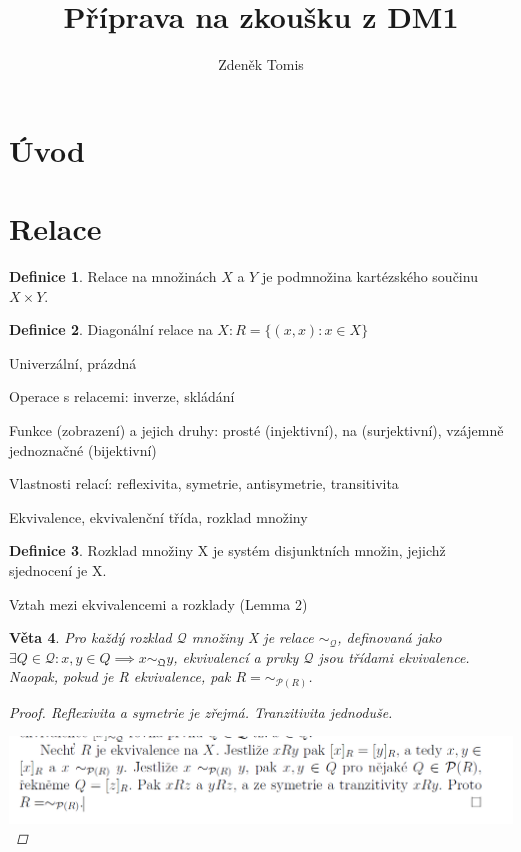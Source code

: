 \documentclass[10pt,a4paper]{article}
\title{Příprava na zkoušku z DM1}
\date{}
\author{Zdeněk Tomis}
\theoremstyle{plain}
\newtheorem{veta}{Věta}
\theoremstyle{definition}
\newtheorem{definice}[veta]{Definice}
\begin{document}
\maketitle

\section{Úvod}

\section{Relace}

\begin{definice} Relace na množinách $X$ a $Y$ je podmnožina kartézského součinu $X \times Y$.
\end{definice}

\begin{definice}
Diagonální relace na $X: R = \{ (x,x):  x \in X \}$
\end{definice} 

Univerzální, prázdná

Operace s relacemi: inverze, skládání

Funkce (zobrazení) a jejich druhy: prosté (injektivní), na (surjektivní), vzájemně jednoznačné (bijektivní)

Vlastnosti relací: reflexivita, symetrie, antisymetrie, transitivita

Ekvivalence, ekvivalenční třída, rozklad množiny

\begin{definice}
Rozklad množiny X je systém disjunktních množin, jejichž sjednocení je X.
\end{definice}



Vztah mezi ekvivalencemi a rozklady (Lemma 2) 
\begin{veta}
Pro každý rozklad  $\mathcal{Q}$ množiny X je relace $\sim_\mathcal{Q}$, definovaná jako $\exists Q \in \mathcal{Q}: x,y \in Q \implies x \sim_\mathfrak{Q} y$, ekvivalencí a prvky $\mathcal{Q}$ jsou třídami ekvivalence. 
Naopak, pokud je R ekvivalence, pak $R=\sim_{\mathcal{P}(R)}$.
\begin{proof}
Reflexivita a symetrie je zřejmá. Tranzitivita jednoduše.

\includegraphics[scale=0.5]{ekvivalence_rozklad.png} 
\end{proof}
\end{veta}
\end{document}
